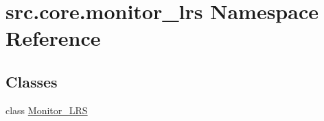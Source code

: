 \hypertarget{namespacesrc_1_1core_1_1monitor__lrs}{}\section{src.\+core.\+monitor\+\_\+lrs Namespace Reference}
\label{namespacesrc_1_1core_1_1monitor__lrs}
\subsection*{Classes}
\begin{DoxyCompactItemize}
\item 
class \hyperlink{classsrc_1_1core_1_1monitor__lrs_1_1Monitor__LRS}{Monitor\+\_\+\+L\+R\+S}
\end{DoxyCompactItemize}
